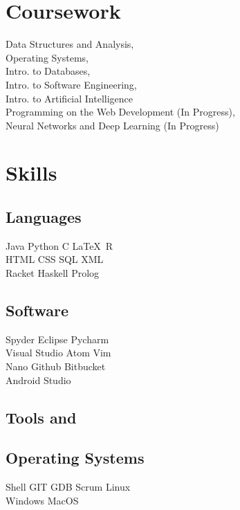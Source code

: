 \documentclass[]{dans-resume}
\begin{document}
\begin{minipage}[t]{0.30\textwidth}


\section{Coursework}
Data Structures and Analysis, \\
Operating Systems, \\
Intro. to Databases,\\
Intro. to Software Engineering, \\
Intro. to Artificial Intelligence \\
Programming on the Web Development (In Progress), \\
Neural Networks and Deep Learning (In Progress)\\
\sectionsep

\section{Skills}

\subsection{Languages}
Java \textbullet{} Python \textbullet{} C \textbullet \LaTeX\ \textbullet R \\
HTML \textbullet{} CSS \textbullet{} SQL \textbullet{} XML\\
Racket \textbullet{} Haskell \textbullet{} Prolog\\
\sectionsep

\subsection{Software}
Spyder \textbullet{} Eclipse \textbullet{} Pycharm \\
Visual Studio \textbullet{} Atom \textbullet{} Vim \\
Nano \textbullet{} Github \textbullet{} Bitbucket \\
Android Studio
\sectionsep

\subsection{Tools and}
\subsection{Operating Systems}
Shell  \textbullet{} GIT \textbullet{} GDB  \textbullet{}
Scrum \textbullet{} Linux \\
Windows \textbullet{} MacOS \\
\sectionsep
\end{minipage}
\end{document}

